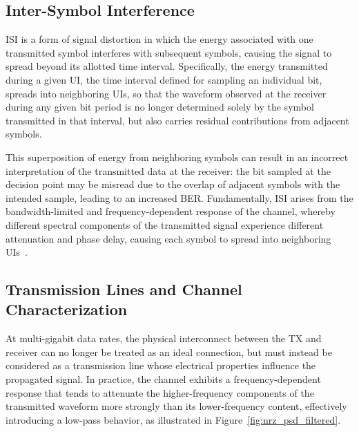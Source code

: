 \subsection{Inter-Symbol Interference}\label{sec:isi_detailed}

\ac{ISI} is a form of signal distortion in which the energy associated with one transmitted symbol interferes with subsequent symbols, causing the signal to spread beyond its allotted time interval. Specifically, the energy transmitted during a given \ac{UI}, the time interval defined for sampling an individual bit, spreads into neighboring \acp{UI}, so that the waveform observed at the receiver during any given bit period is no longer determined solely by the symbol transmitted in that interval, but also carries residual contributions from adjacent symbols.

This superposition of energy from neighboring symbols can result in an incorrect interpretation of the transmitted data at the receiver: the bit sampled at the decision point may be misread due to the overlap of adjacent symbols with the intended sample, leading to an increased \ac{BER}. Fundamentally, \ac{ISI} arises from the bandwidth-limited and frequency-dependent response of the channel, whereby different spectral components of the transmitted signal experience different attenuation and phase delay, causing each symbol to spread into neighboring \acsp{UI}~\cite{zamir2018_nrz_pam4}.

\subsection{Transmission Lines and Channel Characterization}\label{sec:transmission_lines}

At multi-gigabit data rates, the physical interconnect between the \ac{TX} and receiver can no longer be treated as an ideal connection, but must instead be considered as a transmission line whose electrical properties influence the propagated signal. In practice, the channel exhibits a frequency-dependent response that tends to attenuate the higher-frequency components of the transmitted waveform more strongly than its lower-frequency content, effectively introducing a low-pass behavior, as illustrated in Figure~\ref{fig:nrz_psd_filtered}. 

